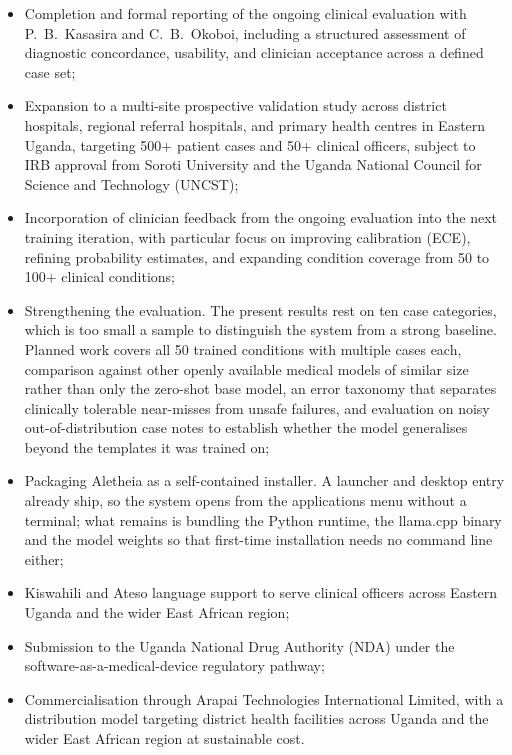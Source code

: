 \documentclass[conference]{IEEEtran}
\begin{document}
\begin{itemize}
  \item Completion and formal reporting of the ongoing clinical
        evaluation with P.~B.~Kasasira and C.~B.~Okoboi, including
        a structured assessment of diagnostic concordance, usability,
        and clinician acceptance across a defined case set;

  \item Expansion to a multi-site prospective validation study
        across district hospitals, regional referral hospitals, and
        primary health centres in Eastern Uganda, targeting 500+
        patient cases and 50+ clinical officers, subject to IRB
        approval from Soroti University and the Uganda National
        Council for Science and Technology (UNCST);

  \item Incorporation of clinician feedback from the ongoing
        evaluation into the next training iteration, with particular
        focus on improving calibration (ECE), refining probability
        estimates, and expanding condition coverage from 50 to
        100+ clinical conditions;

  \item Strengthening the evaluation. The present results rest on ten
        case categories, which is too small a sample to distinguish the
        system from a strong baseline. Planned work covers all 50
        trained conditions with multiple cases each, comparison against
        other openly available medical models of similar size rather
        than only the zero-shot base model, an error taxonomy that
        separates clinically tolerable near-misses from unsafe
        failures, and evaluation on noisy out-of-distribution case
        notes to establish whether the model generalises beyond the
        templates it was trained on;

  \item Packaging Aletheia as a self-contained installer. A launcher
        and desktop entry already ship, so the system opens from the
        applications menu without a terminal; what remains is bundling
        the Python runtime, the llama.cpp binary and the model weights
        so that first-time installation needs no command line either;

  \item Kiswahili and Ateso language support to serve clinical
        officers across Eastern Uganda and the wider East African
        region;

  \item Submission to the Uganda National Drug Authority (NDA)
        under the software-as-a-medical-device regulatory pathway;

  \item Commercialisation through Arapai Technologies International Limited, with a distribution model targeting district
        health facilities across Uganda and the wider East African
        region at sustainable cost.
\end{itemize}
\end{document}
